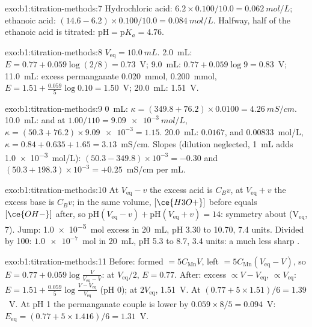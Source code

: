 \begin{solution}{exo:b1:titration-methods:7}
Hydrochloric acid: $6.2 \times 0.100/10.0 = \qty{0.062}{mol/L}$; ethanoic
acid: $(14.6 - 6.2) \times 0.100/10.0 = \qty{0.084}{mol/L}$. Halfway, half
of the ethanoic acid is titrated: $\mathrm{pH} = \mathrm{p}K_a = 4.76$.
\end{solution}

\begin{solution}{exo:b1:titration-methods:8}
$V_{\mathrm{eq}} = \qty{10.0}{mL}$. 2.0~mL: $E = 0.77 + 0.059\log(2/8) =
0.73$~V; 9.0~mL: $0.77 + 0.059\log 9 = 0.83$~V; 11.0~mL: excess
permanganate \qty{0.020}{mmol},  \qty{0.200}{mmol}, $E = 1.51 +
\frac{0.059}{5}\log 0.10 = 1.50$~V; 20.0~mL: 1.51~V.
\end{solution}

\begin{solution}{exo:b1:titration-methods:9}
0~mL: $\kappa = (349.8 + 76.2) \times 0.0100 = \qty{4.26}{mS/cm}$.
10.0~mL:  and  at $1.00/110 = \qty{9.09e-3}{mol/L}$,
$\kappa = (50.3 + 76.2) \times \num{9.09e-3} = 1.15$. 20.0~mL: 
$0.0167$,  and  $0.00833$~mol/L, $\kappa = 0.84 + 0.635 + 1.65
= 3.13$~mS/cm. Slopes (dilution neglected, \qty{1}{mL} adds
\qty{1.0e-3}{mol/L}): $(50.3 - 349.8) \times 10^{-3} = -0.30$ and
$(50.3 + 198.3) \times 10^{-3} = +0.25$~mS/cm per mL.
\end{solution}

\begin{solution}{exo:b1:titration-methods:10}
At $V_{\mathrm{eq}} - v$ the excess acid is $C_Bv$, at $V_{\mathrm{eq}} + v$
the excess base is $C_Bv$; in the same volume, $[\ce{H3O+}]$ before equals
$[\ce{OH-}]$ after, so $\mathrm{pH}(V_{\mathrm{eq}} - v) +
\mathrm{pH}(V_{\mathrm{eq}} + v) = 14$: symmetry about (V$_{\mathrm{eq}}$,
7). Jump: \qty{1.0e-5}{mol} excess in \qty{20}{mL}, pH 3.30 to 10.70, 7.4
units. Divided by 100: $\num{1.0e-7}$~mol in \qty{20}{mL}, pH 5.3 to 8.7,
3.4 units: a much less sharp .
\end{solution}

\begin{solution}{exo:b1:titration-methods:11}
Before:  formed $= 5C_{\mathrm{Mn}}V$,  left $=
5C_{\mathrm{Mn}}(V_{\mathrm{eq}} - V)$, so $E = 0.77 + 0.059\log\frac{V}{V_{\mathrm{eq}}
- V}$: at $V_{\mathrm{eq}}/2$, $E = 0.77$. After: excess  $\propto
V - V_{\mathrm{eq}}$,  $\propto V_{\mathrm{eq}}$: $E = 1.51 +
\frac{0.059}{5}\log\frac{V - V_{\mathrm{eq}}}{V_{\mathrm{eq}}}$ (pH 0); at
$2V_{\mathrm{eq}}$, 1.51~V. At  $(0.77 + 5 \times 1.51)/6 =
1.39$~V. At pH 1 the permanganate couple is lower by $0.059 \times 8/5 =
0.094$~V: $E_{\mathrm{eq}} = (0.77 + 5 \times 1.416)/6 = 1.31$~V.
\end{solution}

